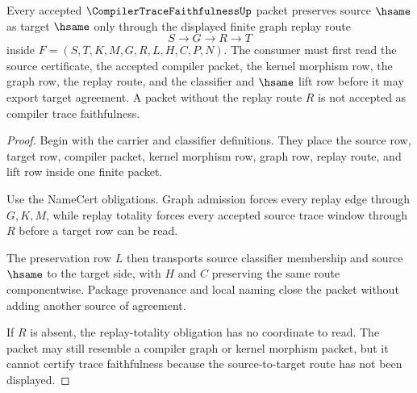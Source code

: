 \begin{theorem}
\label{thm:compiler-trace-faithfulness-finite-replay-boundary}
Every accepted $\CompilerTraceFaithfulnessUp$ packet preserves source $\hsame$ as target $\hsame$ only through the displayed finite graph replay route
$$
S \to G \to R \to T
$$
inside $F=(S,T,K,M,G,R,L,H,C,P,N)$. The consumer must first read the source certificate, the accepted compiler packet, the kernel morphism row, the graph row, the replay route, and the classifier and $\hsame$ lift row before it may export target agreement. A packet without the replay route $R$ is not accepted as compiler trace faithfulness.
\end{theorem}
\begin{proof}
Begin with the carrier and classifier definitions. They place the source row, target row, compiler packet, kernel morphism row, graph row, replay route, and lift row inside one finite packet.

Use the NameCert obligations. Graph admission forces every replay edge through $G,K,M$, while replay totality forces every accepted source trace window through $R$ before a target row can be read.

The preservation row $L$ then transports source classifier membership and source $\hsame$ to the target side, with $H$ and $C$ preserving the same route componentwise. Package provenance and local naming close the packet without adding another source of agreement.

If $R$ is absent, the replay-totality obligation has no coordinate to read. The packet may still resemble a compiler graph or kernel morphism packet, but it cannot certify trace faithfulness because the source-to-target route has not been displayed.
\end{proof}

